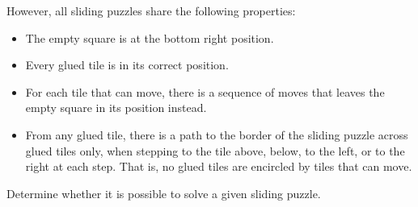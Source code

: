 However, all sliding puzzles share the following properties:
\begin{itemize}
\item The empty square is at the bottom right position.
\item Every glued tile is in its correct position.
\item For each tile that can move, there is a sequence of moves
  that leaves the empty square in its position instead.
\item From any glued tile,
  there is a path to the border of the sliding puzzle across glued tiles only,
  when stepping to the tile above, below, to the left, or to the right at each step.
  That is, no glued tiles are encircled by tiles that can move.
\end{itemize}

Determine whether it is possible to solve a given sliding puzzle.

